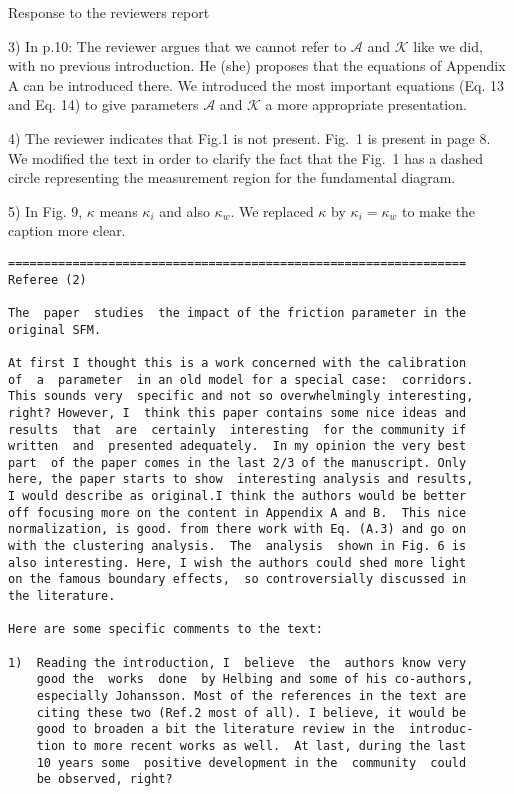 \documentclass[a4paper,12pt]{letter}
\begin{document}
\begin{letter}{Response to the reviewers report}
{%
3) In p.10: The reviewer argues that we cannot refer to $\mathcal{A}$ and $\mathcal{K}$ like we did, with no previous introduction. He (she) proposes that the equations of Appendix A can be introduced there. We introduced the most important equations (Eq. 13 and Eq. 14) to give parameters $\mathcal{A}$ and $\mathcal{K}$ a more appropriate presentation. 

4) The reviewer indicates that Fig.1 is not present. Fig.~1 is present in page 8.  \\

We modified the text in order to clarify the fact that the Fig.~1 has a 
dashed circle representing the measurement region for the fundamental diagram. 

5) In Fig. 9, $\kappa$ means $\kappa_i$ and also $\kappa_w$. We replaced $\kappa$ by $\kappa_i = \kappa_w$ to make the caption more clear.   


}

\newpage

\begin{verbatim}
================================================================
Referee (2)

The  paper  studies  the impact of the friction parameter in the 
original SFM.

At first I thought this is a work concerned with the calibration 
of  a  parameter  in an old model for a special case:  corridors. 
This sounds very  specific and not so overwhelmingly interesting,
right? However, I  think this paper contains some nice ideas and 
results  that  are  certainly  interesting  for the community if 
written  and  presented adequately.  In my opinion the very best 
part  of the paper comes in the last 2/3 of the manuscript. Only 
here, the paper starts to show  interesting analysis and results,
I would describe as original.I think the authors would be better
off focusing more on the content in Appendix A and B.  This nice 
normalization, is good. from there work with Eq. (A.3) and go on 
with the clustering analysis.  The  analysis  shown in Fig. 6 is 
also interesting. Here, I wish the authors could shed more light
on the famous boundary effects,  so controversially discussed in
the literature.

Here are some specific comments to the text:

1)  Reading the introduction, I  believe  the  authors know very
    good the  works  done  by Helbing and some of his co-authors,
    especially Johansson. Most of the references in the text are
    citing these two (Ref.2 most of all). I believe, it would be
    good to broaden a bit the literature review in the  introduc-
    tion to more recent works as well.  At last, during the last
    10 years some  positive development in the  community  could 
    be observed, right?


\end{verbatim}
\end{letter}
\end{document}
